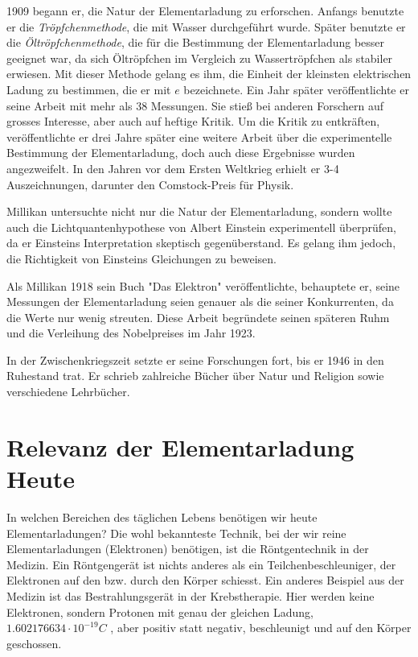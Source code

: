 1909 begann er, die Natur der Elementarladung zu erforschen. Anfangs benutzte er die \textit{Tröpfchenmethode}, die mit Wasser durchgeführt wurde. Später benutzte er die \textit{Öltröpfchenmethode}, die für die Bestimmung der Elementarladung besser geeignet war, da sich Öltröpfchen im Vergleich zu Wassertröpfchen als stabiler erwiesen.  Mit dieser Methode gelang es ihm, die Einheit der kleinsten elektrischen Ladung zu bestimmen, die er mit $e$ bezeichnete. Ein Jahr später veröffentlichte er seine Arbeit mit mehr als 38 Messungen. Sie stieß bei anderen Forschern auf grosses Interesse, aber auch auf heftige Kritik. Um die Kritik zu entkräften, veröffentlichte er drei Jahre später eine weitere Arbeit über die experimentelle Bestimmung der Elementarladung, doch auch diese Ergebnisse wurden angezweifelt. In den Jahren vor dem Ersten Weltkrieg erhielt er 3-4 Auszeichnungen, darunter den Comstock-Preis für Physik.

Millikan untersuchte nicht nur die Natur der Elementarladung, sondern wollte auch die Lichtquantenhypothese von Albert {\sc Einstein} experimentell überprüfen, da er Einsteins Interpretation skeptisch gegenüberstand. Es gelang ihm jedoch, die Richtigkeit von Einsteins Gleichungen zu beweisen.

Als Millikan 1918 sein Buch "Das Elektron" veröffentlichte, behauptete er, seine Messungen der Elementarladung seien genauer als die seiner Konkurrenten, da die Werte nur wenig streuten. Diese Arbeit begründete seinen späteren Ruhm und die Verleihung des Nobelpreises im Jahr 1923. 

In der Zwischenkriegszeit setzte er seine Forschungen fort, bis er 1946 in den Ruhestand trat. Er schrieb zahlreiche Bücher über Natur und Religion sowie verschiedene Lehrbücher. %

\section{Relevanz der Elementarladung Heute}\label{sec:relevanz}
In welchen Bereichen des täglichen Lebens benötigen wir heute Elementarladungen? Die wohl bekannteste Technik, bei der wir reine Elementarladungen (Elektronen) benötigen, ist die Röntgentechnik in der Medizin. Ein Röntgengerät ist nichts anderes als ein Teilchenbeschleuniger, der Elektronen auf den bzw. durch den Körper schiesst. Ein anderes Beispiel aus der Medizin ist das Bestrahlungsgerät in der Krebstherapie. Hier werden keine Elektronen, sondern Protonen mit genau der gleichen Ladung, $1.602176634 \cdot 10^{-19} C$ \parencite[123]{fundamentum_mathe}, aber positiv statt negativ, beschleunigt und auf den Körper geschossen. 

